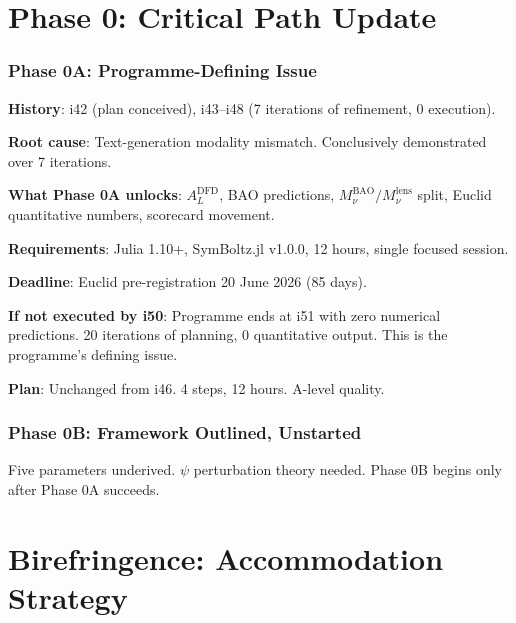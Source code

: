 \documentclass[11pt,a4paper]{article}
\begin{document}
\part{Phase 0: Critical Path Update}

\section{Phase 0A: Programme-Defining Issue}

\begin{tcolorbox}[colback=red!5!white, colframe=red!60!black,
  title={Phase 0A: SEVEN ITERATIONS WITHOUT EXECUTION --- Programme-Defining}]

\textbf{History}: i42 (plan conceived), i43--i48 (7 iterations of refinement, 0 execution).

\textbf{Root cause}: Text-generation modality mismatch. Conclusively demonstrated over 7 iterations.

\textbf{What Phase 0A unlocks}: $A_L^{\text{DFD}}$, BAO predictions, $M_\nu^{\text{BAO}}/M_\nu^{\text{lens}}$ split, Euclid quantitative numbers, scorecard movement.

\textbf{Requirements}: Julia 1.10+, SymBoltz.jl v1.0.0, 12 hours, single focused session.

\textbf{Deadline}: Euclid pre-registration 20 June 2026 (85 days).

\textbf{If not executed by i50}: Programme ends at i51 with zero numerical predictions. 20 iterations of planning, 0 quantitative output. This is the programme's defining issue.

\textbf{Plan}: Unchanged from i46. 4 steps, 12 hours. A-level quality.
\end{tcolorbox}

\section{Phase 0B: Framework Outlined, Unstarted}

Five parameters underived. $\psi$ perturbation theory needed. Phase 0B begins only after Phase 0A succeeds.


\part{Birefringence: Accommodation Strategy}
\end{document}
